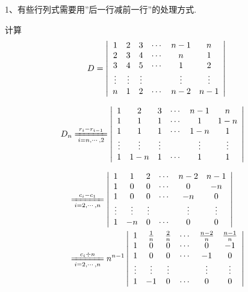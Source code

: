\begin{frame}
  1、有些行列式需要用''后一行减前一行''的处理方式.
  \begin{li}
    计算
    $$
    D = \left |
      \begin{array}{cccccc}
        1 &  2 &  3 & \cdots &  n-1 & n\\
        2 &  3 &  4 & \cdots &   n  & 1\\
        3 &  4 &  5 & \cdots &   1  & 2\\
        \vdots& \vdots& \vdots&     & \vdots  & \vdots \\
        n &  1 &  2 & \cdots & n-2  & n-1
      \end{array}
    \right|
    $$
  \end{li}
  \begin{jie}
    $$
    \begin{aligned}
      D_n &   
      \xlongequal[i=n,\cdots,2]{r_i-r_{i-1}} 
      \left|
        \begin{array}{cccccc}
          1   &  2 &  3 & \cd &  n-1 & n\\
          1   &  1 &  1 & \cd &   1  & 1-n \\
          1   &  1 &  1 & \cd &  1-n  & 1\\
          \vd & \vd & \vd&     & \vd  & \vd \\
          1   & 1-n &  1 & \cd &   1   & 1
        \end{array}
      \right|    \end{aligned}
    $$
  \end{jie}
\end{frame}
\begin{frame}
  $$
  \begin{aligned}
    &  
    \xlongequal[i=2,\cdots,n]{c_i-c_1} 
    \left|
      \begin{array}{cccccc}
        1   &  1 &  2 & \cd &  n-2 & n-1\\
        1   &  0 &  0 & \cd &   0  & -n \\
        1   &  0 &  0 & \cd &  -n  & 0\\
        \vd & \vd & \vd&     & \vd  & \vd \\
        1   & -n &  0 & \cd &   0   & 0
      \end{array}
    \right|\\
    &   \xlongequal[i=2,\cd,n]{c_i\div n} n^{n-1} 
    \left|
      \begin{array}{cccccc}
        1   &  \frac 1n & \frac 2n & \cd &  \frac{n-2}n & \frac{n-1}n\\
        1   &  0 &  0 & \cd &   0  & -1 \\
        1   &  0 &  0 & \cd &  -1  & 0\\
        \vd & \vd & \vd&     & \vd  & \vd \\
        1   & -1 &  0 & \cd &   0   & 0
      \end{array}
    \right|
  \end{aligned}
  $$
\end{frame}
